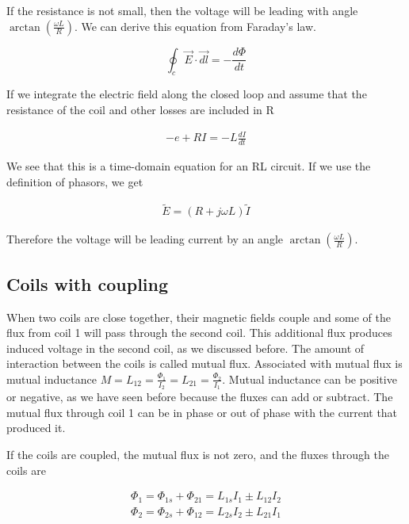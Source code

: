 \documentclass{ximera}
\begin{document}
 If the resistance is not small, then the voltage will be leading with angle $\arctan(\frac{\omega L}{R})$. We can derive this equation from Faraday's law.
 
 

\begin{equation}
\oint_c \vec{E} \cdot \vec{dl} =  - \frac{d\Phi}{dt}
\end{equation}

If we integrate the electric field along the closed loop and assume that the resistance of the coil and other losses are included in R

\begin{eqnarray}
-e + R I = - L \frac{d I}{dt}
\end{eqnarray}

We see that this is a time-domain equation for an RL circuit. If we use the definition of phasors, we get 

\begin{eqnarray}
\tilde{E} = (R + j \omega L) \tilde{I}
\end{eqnarray}

Therefore the voltage will be leading current by an angle $\arctan(\frac{\omega L}{R})$.

\subsection{Coils with coupling}

When two coils are close together, their magnetic fields couple and some of the flux from coil 1 will pass through the second coil. This additional flux produces induced voltage in the second coil, as we discussed before. The amount of interaction between the coils is called mutual flux. Associated with mutual flux is mutual inductance $M=L_{12}=\frac{\Phi_{1}}{I_2}=L_{21}=\frac{\Phi_{2}}{I_1}	$. Mutual inductance can be positive or negative, as we have seen before because the fluxes can add or subtract. The mutual flux through coil 1 can be in phase or out of phase with the current that produced it.

If the coils are coupled, the mutual flux is not zero, and the fluxes through the coils are

\begin{eqnarray}
\Phi_1=\Phi_{1s} + \Phi_{21} = L_{1s} I_1 \pm L_{12} I_2 \\
\Phi_2= \Phi_{2s} + \Phi_{12} = L_{2s} I_2 \pm L_{21} I_1 
\end{eqnarray}
\end{document}
